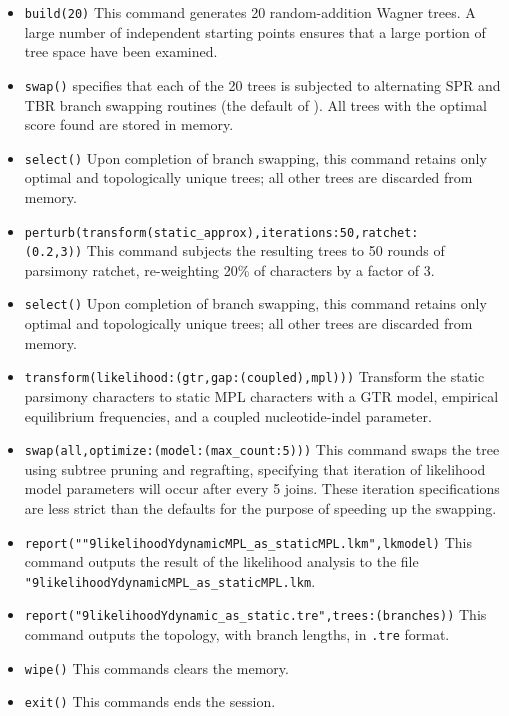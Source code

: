 \begin{itemize}
\item \texttt{build(20)} This command generates 20 random-addition Wagner trees. A large number of 
independent starting points ensures that a large portion of tree space have been examined.
\item \texttt{swap()}  specifies that each of the 20 trees is subjected to alternating SPR and 
TBR branch swapping routines (the default of \poy). All trees with the optimal score found are stored in memory.
\item \texttt{select()} Upon completion of branch swapping, this command retains only optimal and topologically 
unique trees; all other trees are discarded from memory. 
\item \texttt{perturb(transform(static\_approx),iterations:50,ratchet:\\(0.2,3))} This command subjects the resulting 
trees to 50 rounds of parsimony ratchet, re-weighting 20\% of characters by a factor of 3.
\item \texttt{select()} Upon completion of branch swapping, this command retains only optimal and topologically 
unique trees; all other trees are discarded from memory. 
\item \texttt{transform(likelihood:(gtr,gap:(coupled),mpl)))} Transform the static parsimony characters to static 
MPL characters with a GTR model, empirical equilibrium frequencies, and a coupled nucleotide-indel 
parameter.
\item \texttt{swap(all,optimize:(model:(max\_count:5)))} This command swaps the tree using subtree pruning and 
regrafting, specifying that iteration of likelihood model parameters will occur after every 5 joins. These iteration 
specifications are less strict than the defaults for the purpose of speeding up the swapping.
\item \texttt{report(""9likelihoodYdynamicMPL\_as\_staticMPL.lkm",lkmodel)} This command outputs the result of 
the likelihood analysis to the file \texttt{"9likelihoodYdynamicMPL\_as\_staticMPL.lkm}.
\item \texttt{report("9likelihoodYdynamic\_as\_static.tre",trees:(branches))} This command outputs the topology, 
with branch lengths, in \texttt{.tre} format.
\item \texttt{wipe()} This commands clears the memory.
\item \texttt{exit()} This commands ends the \poy session.
\end{itemize}
